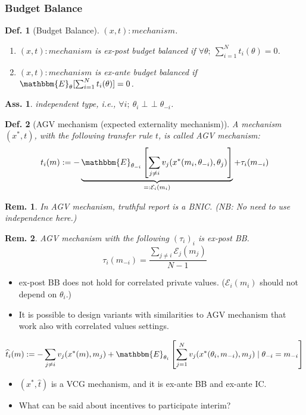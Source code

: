 \documentclass[11pt,a4paper,dvipdfmx]{article}
\theoremstyle{plain}
\newtheorem{df}{Def.}[section]
\newtheorem{rem}{Rem.}[section]
\newtheorem{ass}{Ass.}
\newcommand{\mE}{\mathcal{E}}
\renewcommand{\hat}{\widehat}
\newcommand{\E}{\mathbbm{E}}
\newcommand{\1}{\mathbbm{1}}
\newcommand{\indep}{\mathop{\perp\!\!\!\!\perp}}
\begin{document}
\subsubsection{Budget Balance}
\begin{df}[Budget Balance] $(x,t): mechanism$.
	\begin{enumerate}
		\item $(x,t): mechanism$ is ex-post budget balanced if $\forall \theta; \ \sum_{i=1}^N t_i(\theta) = 0$.
		\item $(x,t): mechanism$ is ex-ante budget balanced if $\E_\theta [ \sum_{i=1}^N t_i(\theta)] = 0$.
	\end{enumerate}
\end{df}
\begin{ass}
	independent type, i.e., $\forall i; \ \theta_i \indep \theta_{-i}$.
\end{ass}
\begin{df}[AGV mechanism (expected externality mechanism)] A mechanism $(x^*, t)$, with the following transfer rule $t$, is called AGV mechanism:
	\[
	t_i(m) := - \underbrace{
	\E_{\theta_{-i}} \left[
	\sum_{j \neq i} v_j(x^*(m_i, \theta_{-i}), \theta_j)
	\right]
	}_{=: \mE_i(m_i)}
	+ \tau_i(m_{-i})
	\]
\end{df}
\begin{rem}
	In AGV mechanism, truthful report is a BNIC. (NB: No need to use independence here.)
\end{rem}
\begin{rem} AGV mechanism with the following $(\tau_i)_i$ is ex-post BB.
\[
\tau_i(m_{-i}) = \frac{\sum_{j \neq i} \mE_j(m_j)}{N-1}
\]
\end{rem}

\begin{itemize}
	\item ex-post BB does not hold for correlated private values. ($\mE_i(m_i)$ should not depend on $\theta_i$.)
	\item It is possible to design variants with similarities to AGV mechanism that work also with correlated values settings.
\end{itemize}
\[
\hat{t}_i(m) := - \sum_{j \neq i} v_j(x^*(m), m_j) + \E_{\theta_i}\left[
\sum_{j=1}^N v_j(x^*(\theta_i, m_{-i}), m_j) \mid \theta_{-i} = m_{-i}
\right]
\]
\begin{itemize}
	\item $(x^*, \hat{t})$ is a VCG mechanism, and it is ex-ante BB and ex-ante IC.
	\item What can be said about incentives to participate interim?
\end{itemize}
\end{document}
